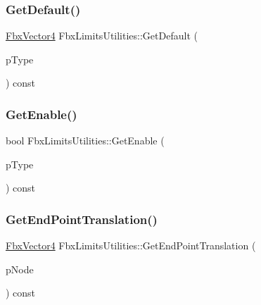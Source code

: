 \subsubsection{\texorpdfstring{Get\+Default()}{GetDefault()}}
{\footnotesize\ttfamily \hyperlink{class_fbx_vector4}{Fbx\+Vector4} Fbx\+Limits\+Utilities\+::\+Get\+Default (\begin{DoxyParamCaption}\item[{\hyperlink{class_fbx_limits_utilities_aa55167751039b3d64b56cb7e58f2e62c}{E\+Type}}]{p\+Type }\end{DoxyParamCaption}) const}

\mbox{\label{class_fbx_limits_utilities_a3224344ce5636d18f22d8ec8a327bba6}} 
\subsubsection{\texorpdfstring{Get\+Enable()}{GetEnable()}}
{\footnotesize\ttfamily bool Fbx\+Limits\+Utilities\+::\+Get\+Enable (\begin{DoxyParamCaption}\item[{\hyperlink{class_fbx_limits_utilities_aa55167751039b3d64b56cb7e58f2e62c}{E\+Type}}]{p\+Type }\end{DoxyParamCaption}) const}

\mbox{\label{class_fbx_limits_utilities_a89a48af2f22f1996c447460bbe7e80fa}} 
\subsubsection{\texorpdfstring{Get\+End\+Point\+Translation()}{GetEndPointTranslation()}}
{\footnotesize\ttfamily \hyperlink{class_fbx_vector4}{Fbx\+Vector4} Fbx\+Limits\+Utilities\+::\+Get\+End\+Point\+Translation (\begin{DoxyParamCaption}\item[{\hyperlink{class_fbx_node}{Fbx\+Node} $\ast$}]{p\+Node }\end{DoxyParamCaption}) const}

